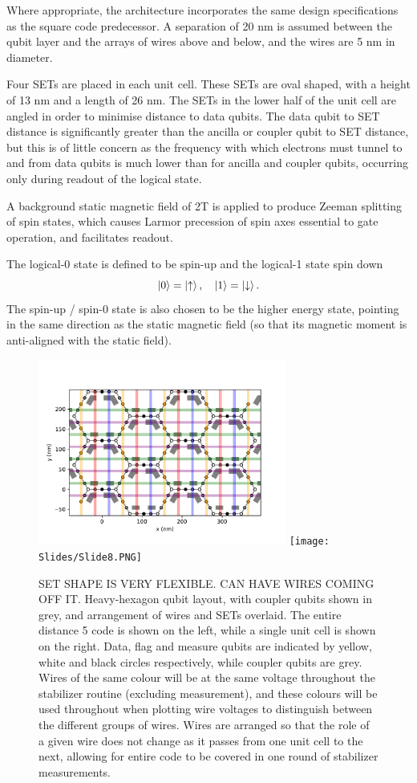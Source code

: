 \documentclass[../Thesis.tex]{subfiles}
\begin{document}
Where appropriate, the architecture incorporates the same design specifications as the square code predecessor. A separation of 20 nm is assumed between the qubit layer and the arrays of wires above and below, and the wires are 5 nm in diameter. 

Four SETs are placed in each unit cell. These SETs are oval shaped, with a height of 13 nm and a length of 26 nm. The SETs in the lower half of the unit cell are angled in order to minimise distance to data qubits. The data qubit to SET distance is significantly greater than the ancilla or coupler qubit to SET distance, but this is of little concern as the frequency with which electrons must tunnel to and from data qubits is much lower than for ancilla and coupler qubits, occurring only during readout of the logical state.

A background static magnetic field of 2T is applied to produce Zeeman splitting of spin states, which causes Larmor precession of spin axes essential to gate operation, and facilitates readout. 

The logical-0 state is defined to be spin-up and the logical-1 state spin down
\begin{equation}
    \ket{0}=\ket{\uparrow},\quad \ket{1}=\ket{\downarrow}.
\end{equation}
The spin-up / spin-0 state is also chosen to be the higher energy state, pointing in the same direction as the static magnetic field (so that its magnetic moment is anti-aligned with the static field).

\begin{figure}
    \centering
    \includegraphics[width=8.15cm]{graphics/ArchitectureDesign/cell_array.pdf}
    \texttt{[image: Slides/Slide8.PNG]}
    \caption{SET SHAPE IS VERY FLEXIBLE. CAN HAVE WIRES COMING OFF IT.\cite{kranz_exploiting_2020} Heavy-hexagon qubit layout, with coupler qubits shown in grey, and arrangement of wires and SETs overlaid. The entire distance 5 code is shown on the left, while a single unit cell is shown on the right. Data, flag and measure qubits are indicated by yellow, white and black circles respectively, while coupler qubits are grey. Wires of the same colour will be at the same voltage throughout the stabilizer routine (excluding measurement), and these colours will be used throughout when plotting wire voltages to distinguish between the different groups of wires. Wires are arranged so that the role of a given wire does not change as it passes from one unit cell to the next, allowing for entire code to be covered in one round of stabilizer measurements.}
    \label{fig:HH-SiP}
\end{figure}
\end{document}

